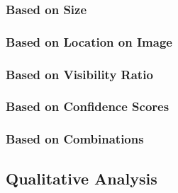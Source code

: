\documentclass[12pt, oneside]{article}
\begin{document}
\subsubsection{Based on Size}
\subsubsection{Based on Location on Image}
\subsubsection{Based on Visibility Ratio}
\subsubsection{Based on Confidence Scores}
\subsubsection{Based on Combinations}

\subsection{Qualitative Analysis}
\end{document}

